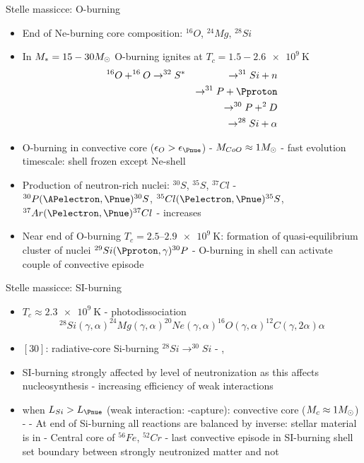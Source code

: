\begin{frame}{Stelle massicce: O-burning}
\begin{itemize}
	\item End of Ne-burning core composition: $^{16}O$, $^{24}Mg$, $^{28}Si$
	\item In $M_*=15-30M_{\odot}$ O-burning ignites at $T_c=1.5-2.6\SI{e9}{\kelvin}$
	\begin{alignat*}{2}
	&^{16}O+^{16}O\to^{32}S^*&\to^{31}Si+n\\
	&&\to^{31}P+\Pproton\\
	&&\to^{30}P+^2D\\
	&&\to^{28}Si+\alpha
	\end{alignat*}
	\item O-burning in convective core ($\epsilon_O>\epsilon_{\Pnue}$) - $M_{CoO}\approx1M_{\odot}$ - fast evolution timescale: shell frozen except Ne-shell
	\item Production of neutron-rich nuclei: $^{30}S$, $^{35}S$, $^{37}Cl$ - $^{30}P(\APelectron,\Pnue)^{30}S$, $^{35}Cl(\Pelectron,\Pnue)^{35}S$, $^{37}Ar(\Pelectron,\Pnue)^{37}Cl$ -  increases
	\item Near end of O-burning $T_c=\numrange{2.5}{2.9}\SI{e9}{\kelvin}$: formation of quasi-equilibrium cluster of nuclei $^{29}Si(\Pproton,\gamma)^{30}P$ - O-burning in shell can activate couple of convective episode
\end{itemize}
\end{frame}

\begin{frame}{Stelle massicce: SI-burning}
\begin{itemize}
	\item $T_c\approx\SI{2.3e9}{\kelvin}$ - photodissociation
	\[^{28}Si(\gamma,\alpha)^{24}Mg(\gamma,\alpha)^{20}Ne(\gamma,\alpha)^{16}O(\gamma,\alpha)^{12}C(\gamma,2\alpha)\alpha\]
	\item $[30]$: radiative-core Si-burning $^{28}Si\to^{30}Si$ - , 
	\item SI-burning strongly affected by level of neutronization as this affects nucleosynthesis - increasing efficiency of weak interactions
	\item when $L_{Si}>L_{\Pnue}$ (weak interaction: \Pelectron-capture): convective core ($M_c\approx1M_{\odot}$) -  - At end of Si-burning all reactions are balanced by inverse: stellar material is in  - Central core of $^{56}Fe$, $^{52}Cr$ - last convective episode in SI-burning shell set boundary between strongly neutronized matter and not
\end{itemize}
\end{frame}

